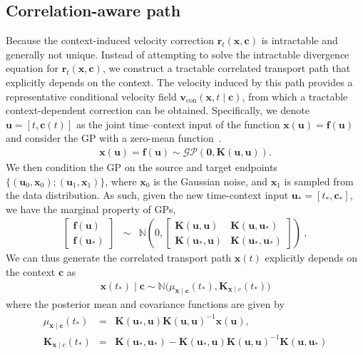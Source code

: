 \documentclass{article} %
\begin{document}
\subsection{Correlation-aware path}
\label{sec:corr_path}
Because the context-induced velocity correction $\mathbf{r}_t(\mathbf{x}, \mathbf{c})$ is intractable and generally not unique. Instead of attempting to solve the intractable divergence equation for $\mathbf{r}_t(\mathbf{x}, \mathbf{c})$, we construct a tractable correlated transport path that explicitly depends on the context. The velocity induced by this path provides a representative conditional velocity field $\mathbf{v}_{\text{con}}(\mathbf{x}, t \mid  \mathbf{c})$, from which a tractable context-dependent correction can be obtained. Specifically, we denote $\mathbf{u} = [t, \mathbf{c}(t)]$ as the joint time--context input of the function $\mathbf{x}(\mathbf{u}) = \mathbf{f}(\mathbf{u})$ and consider the GP with a zero-mean function~\citep{rasmussen2006gaussian}.
\begin{eqnarray}
    \mathbf{x}(\mathbf{u}) =\mathbf{f}(\mathbf{u})
\sim \mathcal{\text{GP}}
\left(\mathbf{0},\bm{K}(\mathbf{u},\mathbf{u})\right).
\end{eqnarray}
We then condition the GP on the source and target endpoints $\big\{(\mathbf{\mathbf{u}}_0, \mathbf{x}_0);(\mathbf{u}_1, \mathbf{x}_1) \big\}$, where $\mathbf{x}_0$ is the Gaussian noise, and $\mathbf{x}_1$ is sampled from the data distribution. As such, given the new time-context input $\mathbf{u}_* = [t_*, \mathbf{c}_*]$, we have the marginal property of GPs,
\begin{eqnarray}
\begin{bmatrix}
\mathbf{f}(\mathbf{u}) \\
\mathbf{f}(\mathbf{u}_*)
\end{bmatrix} &\sim& \mathbb{N}\left(0,
\begin{bmatrix}
\bm{K}(\mathbf{u}, \mathbf{u}) & \bm{K}(\mathbf{u}, \mathbf{u}_*)\\
\bm{K}(\mathbf{u}_*, \mathbf{u}) & \bm{K}(\mathbf{u}_*, \mathbf{u}_*)
\end{bmatrix}
\right)\ , 
\end{eqnarray}
We can thus generate the correlated transport path $\mathbf{x}(t)$ explicitly depends on the context $\mathbf{c}$ as 
\begin{eqnarray}
    \mathbf{x}(t_*) \mid \mathbf{c} \sim \mathbb{N} \big(\mu_{\mathbf{x}\mid \mathbf{c}}(t_*), \bm{K}_{\mathbf{x}\mid c} (t_*) \big)
\end{eqnarray}
where the posterior mean and covariance functions are given by
\begin{eqnarray}
    \mu_{\mathbf{x}\mid \mathbf{c}}(t_*) &=& \bm{K}(\mathbf{u}_*, \mathbf{u}) \bm{K}(\mathbf{u}, \mathbf{u})^{-1} \mathbf{x}(\mathbf{u}) , \nonumber \\
    \bm{K}_{\mathbf{x}\mid c} (t_*) &=& \bm{K}(\mathbf{u}_*, \mathbf{u}_*) - \bm{K}(\mathbf{u}_*, \mathbf{u}) \bm{K}(\mathbf{u}, \mathbf{u})^{-1} \bm{K}(\mathbf{u}, \mathbf{u}_*)
\end{eqnarray}
\end{document}
